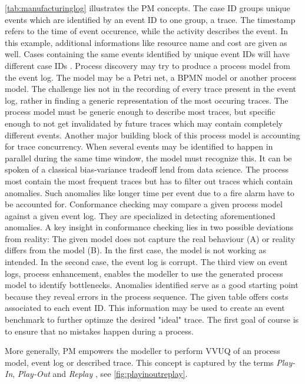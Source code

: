 \autoref{tab:manufacturinglog} illustrates the PM concepts. The case ID groups unique events which are identified by an event ID to one group, a trace. The timestamp refers to the time of event occurence, while the activity describes the event. In this example, additional informations like resource name and cost are given as well. Cases containing the same events identified by unique event IDs will have different case IDs \parencite{van2016data}. Process discovery may try to produce a process model from the event log. The model may be a Petri net, a BPMN model or another process model. The challenge lies not in the recording of every trace present in the event log, rather in finding a generic representation of the most occuring traces. The process model must be generic enough to describe most traces, but specific enough to not get invalidated by future traces which may contain completely different events. Another major building block of this process model is accounting for trace concurrency. When several events may be identified to happen in parallel during the same time window, the model must recognize this. It can be spoken of a classical bias-variance tradeoff lend from data science. The process most contain the most frequent traces but has to filter out traces which contain anomalies. Such anomalies like longer time per event due to a fire alarm have to be accounted for. Conformance checking may compare a given process model against a given event log. They are specialized in detecting aforementioned anomalies. A key insight in conformance checking lies in two possible deviations from reality: The given model does not capture the real behaviour (A) or reality differs from the model (B). In the first case, the model is not working as intended. In the second case, the event log is corrupt. The third view on event logs, process enhancement, enables the modeller to use the generated process model to identify bottlenecks. Anomalies identified serve as a good starting point because they reveal errors in the process sequence. The given table offers costs associated to each event ID. This information may be used to create an event benchmark to further optimze the desired "ideal" trace. The first goal of course is to ensure that no mistakes happen during a process.

More generally, PM empowers the modeller to perform VVUQ of an process model, event log or described trace. This concept is captured by the terms \textit{Play-In}, \textit{Play-Out} and \textit{Replay} \parencite{damm2001lscs}, see \autoref{fig:playinoutreplay}.

